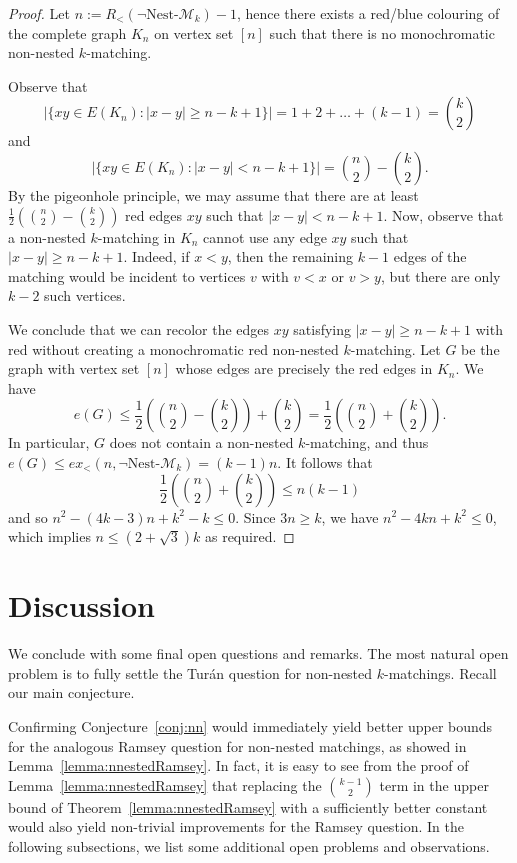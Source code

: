 \documentclass[11pt]{article}
\theoremstyle{definition}
\begin{document}
\begin{proof}
    Let $n:=R_<(\neg\text{Nest-}\mathcal M_k)-1$, hence there exists a red/blue colouring of the complete graph $K_n$ on vertex set $[n]$ such that there is no monochromatic non-nested $k$-matching.

    Observe that 
    $$|\{xy\in E(K_n):|x-y|\ge n-k+1 \}|=1+2+\dots+(k-1)=\binom{k}{2}$$ 
    and
    $$|\{xy\in E(K_n):|x-y|< n-k+1 \}|=\binom{n}{2}-\binom{k}{2}.$$
    By the pigeonhole principle, we may assume that there are at least $\frac{1}{2}(\binom{n}{2}-\binom{k}{2})$ red edges $xy$ such that $|x-y|<n-k+1$.
    Now, observe that a non-nested $k$-matching in $K_n$ cannot use any edge $xy$ such that $|x-y|\ge n-k+1$.
    Indeed, if $x<y$, then the remaining $k-1$ edges of the matching would be incident to vertices $v$ with $v<x$ or $v>y$, but there are only $k-2$ such vertices.

    We conclude that we can recolor the edges $xy$ satisfying $|x-y|\ge n-k+1$ with red without creating a monochromatic red non-nested $k$-matching.
    Let $G$ be the graph with vertex set $[n]$ whose edges are precisely the red edges in $K_n$.
    We have
    $$e(G)\le\frac{1}{2}\left(\binom{n}{2}-\binom{k}{2}\right)+\binom{k}{2}=\frac{1}{2}\left(\binom{n}{2}+\binom{k}{2}\right).$$
    In particular, $G$ does not contain a non-nested $k$-matching, and thus $e(G)\le ex_<(n,\neg\text{Nest-}\mathcal M_k)=(k-1)n$.
    It follows that
    $$\frac{1}{2}\left(\binom{n}{2}+\binom{k}{2}\right)\le n(k-1)$$
    and so $n^2-(4k-3)n+k^2-k\le0$.
    Since $3n\ge k$, we have $n^2-4kn+k^2\le0$, which implies $n\le(2+\sqrt{3})k$ as required.
\end{proof}

\section{Discussion}\label{sec:conclusion}

We conclude with some final open questions and remarks.
The most natural open problem is to fully settle the Tur\'an question for non-nested $k$-matchings.
Recall our main conjecture.

\nnconj*

Confirming Conjecture~\ref{conj:nn} would immediately yield better upper bounds for the analogous Ramsey question for non-nested matchings, as showed in Lemma~\ref{lemma:nnestedRamsey}.
In fact, it is easy to see from the proof of Lemma~\ref{lemma:nnestedRamsey} that replacing the $\binom{k-1}{2}$ term in the upper bound of Theorem~\ref{lemma:nnestedRamsey} with a sufficiently better constant would also yield non-trivial improvements for the Ramsey question.
In the following subsections, we list some additional open problems and observations.
\end{document}
